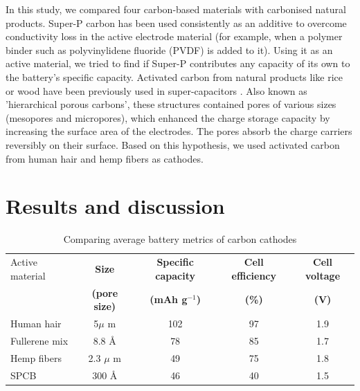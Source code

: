 \documentclass{article}
\begin{document}
In this study, we compared four carbon-based materials with carbonised natural products. Super-P carbon has been used consistently as an additive to overcome conductivity loss in the active electrode material (for example, when a polymer binder such as polyvinylidene fluoride (PVDF) is added to it). Using it as an active material, we tried to find if Super-P contributes any capacity of its own to the battery's specific capacity. Activated carbon from natural products like rice or wood have been previously used in super-capacitors \cite{hussain_development_2019, frackowiak_carbon_2001}. Also known as 'hierarchical porous carbons', these structures contained pores of various sizes (mesopores and micropores), which enhanced the charge storage capacity by increasing the surface area of the electrodes. The pores absorb the charge carriers reversibly on their surface. Based on this hypothesis, we used activated carbon from human hair and hemp fibers as cathodes. 

\section{Results and discussion}

\begin{table}[tbh!]
\caption{Comparing average battery metrics of carbon cathodes} \label{table1}
\begin{center}
\begin{tabular}{|lcccc|}
\hline
Active material & {\textbf{Size}} & {\textbf{Specific capacity}} & {\textbf{Cell efficiency}} & {\textbf{Cell voltage}}\\
 & {\textbf{(pore size)}} & {\textbf{(mAh g$^{-1}$)}} & {\textbf{(\%)}} & {\textbf{(V)}}\\
\hline
Human hair & 5${\mu}$ m & 102 & 97 & 1.9 \\
Fullerene mix & 8.8 \AA & 78 & 85 & 1.7 \\
Hemp fibers & 2.3 $\mu$ m & 49 & 75 & 1.8 \\
SPCB & 300 \AA & 46 & 40 & 1.5 \\
\hline  %
\end{tabular}
\end{center}
\end{table}
\end{document}
